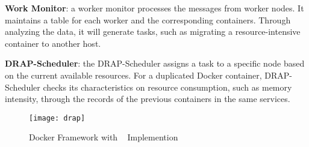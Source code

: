 {\bf Work Monitor}: a worker monitor processes the messages from worker nodes. It maintains a table for each worker and the corresponding containers. 
Through analyzing the data, it will generate tasks, such as migrating a resource-intensive container to another host.

{\bf DRAP-Scheduler}: the DRAP-Scheduler assigns a task to a specific node based on the current available resources. For a duplicated Docker container,
DRAP-Scheduler checks its characteristics on resource consumption, 
such as memory intensity, through the records of the previous containers in the same services.



\begin{figure}[ht]
\centering
\texttt{[image: drap]}
\caption{Docker Framework with \sol~ Implemention}
\label{fig:drap} 
\end{figure}